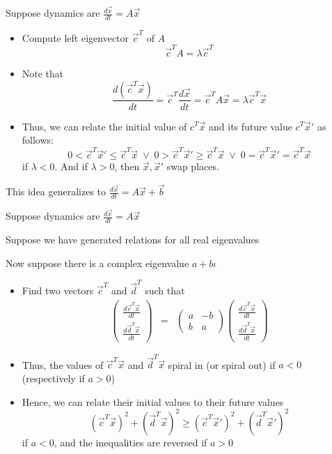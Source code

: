 \documentclass{seminar}
\begin{document}
\begin{slide}

Suppose dynamics are $\frac{d\vec{x}}{dt} = A\vec{x}$

\begin{itemize}
\item Compute left eigenvector $\vec{c}^T$ of $A$
$$  \vec{c}^T A  = \lambda \vec{c}^T $$
\item
 Note that 
$$
 \frac{d(\vec{c}^T \vec{x})}{dt} =
 \vec{c}^T\frac{d\vec{x}}{dt} =
 \vec{c}^T A\vec{x} = \lambda \vec{c}^T\vec{x}
$$
\item
 Thus, we can relate the initial value of $c^T\vec{x}$ 
 and its future value $c^T\vec{x}'$ as follows:
$$
 0 < \vec{c}^T\vec{x}' \leq \vec{c}^T\vec{x}  \;\vee\;
 0 > \vec{c}^T\vec{x}' \geq \vec{c}^T\vec{x}  \;\vee\;
 0 = \vec{c}^T\vec{x}' = \vec{c}^T\vec{x}
$$
if $\lambda < 0$.  And if $\lambda > 0$, then $\vec{x},\vec{x}'$ swap places.
\end{itemize}

This idea generalizes to $\frac{d\vec{x}}{dt} = A\vec{x} + \vec{b}$

\end{slide}
\begin{slide}

Suppose dynamics are $\frac{d\vec{x}}{dt} = A\vec{x}$

Suppose we have generated relations for all real eigenvalues

Now suppose there is a complex eigenvalue $a + b\iota$

\begin{itemize}
\item Find two vectors $\vec{c}^T$ and $\vec{d}^T$ such that
\begin{eqnarray*}
 \left(\begin{array}{c}
 \frac{d\vec{c}^T\vec{x}}{dt} \\
 \frac{d\vec{d}^T\vec{x}}{dt} 
 \end{array}\right)
 & = & 
  \left(\begin{array}{cc}
   a & -b \\ b & a
  \end{array}\right)
 \left(\begin{array}{c}
 \frac{d\vec{c}^T\vec{x}}{dt} \\
 \frac{d\vec{d}^T\vec{x}}{dt} 
 \end{array}\right)
\end{eqnarray*}

\item
 Thus,
 the values of $\vec{c}^T\vec{x}$ and $\vec{d}^T\vec{x}$ 
 spiral in (or spiral out) if $a < 0$ (respectively if $a > 0$) 

\item
 Hence, we can relate their initial values to their future values
$$
 (\vec{c}^T \vec{x})^2 + 
 (\vec{d}^T \vec{x})^2 
 \geq
 ({\vec{c}}^{T} \vec{x}')^2 + 
 ({\vec{d}}^{T} \vec{x}')^2 
$$
if $a < 0$, and the inequalities are reversed if $a > 0$
 
\end{itemize}

\end{slide}
\end{document}

